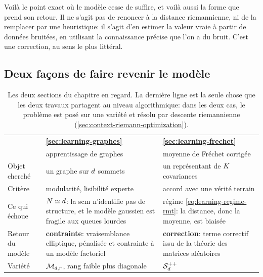 Voilà le point exact où le modèle cesse de suffire, et voilà aussi la forme que
prend son retour. Il ne s'agit pas de renoncer à la distance riemannienne, ni
de la remplacer par une heuristique: il s'agit d'en estimer la valeur vraie à
partir de données bruitées, en utilisant la connaissance précise que l'on a du
bruit. C'est une correction, au sens le plus littéral.

\subsection{Deux façons de faire revenir le modèle}
\label{subsec:learning-deux-facons}

\begin{table}[htb]
  \centering
  \small
  \begin{tabular}{@{}p{}p{}p{}@{}}
    \toprule
    & \textbf{\cref{sec:learning-graphes}} & \textbf{\cref{sec:learning-frechet}} \\
    & apprentissage de graphes & moyenne de Fréchet corrigée \\
    \midrule
    Objet cherché
      & un graphe sur $d$ sommets
      & un représentant de $K$ covariances \\
    Critère
      & modularité, lisibilité experte
      & accord avec une vérité terrain \\
    Ce qui échoue
      & $N\simeq d$: la scm n'identifie pas de structure, et le modèle
        gaussien est fragile aux queues lourdes
      & régime \cref{eq:learning-regime-rmt}: la distance, donc la moyenne,
        est biaisée \\
    Retour du modèle
      & \textbf{contrainte}: vraisemblance elliptique, pénalisée et contrainte
        à un modèle factoriel
      & \textbf{correction}: terme correctif issu de la théorie des matrices
        aléatoires \\
    Variété
      & $\mathcal{M}_{d,r}$, rang faible plus diagonale
      & $\mathcal{S}_{d}^{++}$ \\
    \bottomrule
  \end{tabular}
  \caption[Les deux façons de faire revenir le modèle]{Les deux sections du
    chapitre en regard. La dernière ligne est la seule chose que les deux
    travaux partagent au niveau algorithmique: dans les deux cas, le problème
    est posé sur une variété et résolu par descente riemannienne
    (\cref{sec:context-riemann-optimization}).}
  \label{tab:learning-deux-facons}
\end{table}

